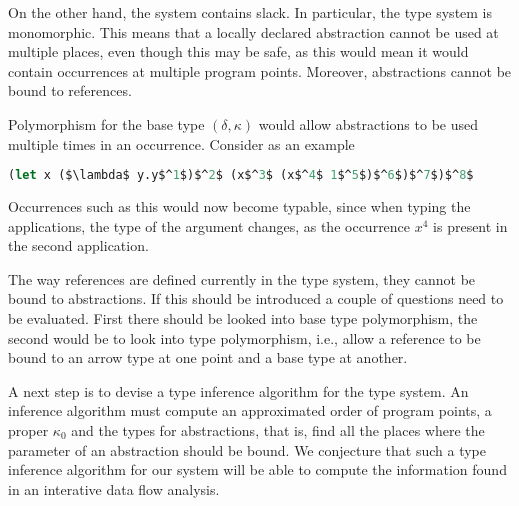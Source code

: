 \documentclass{llncs}
\begin{document}
On the other hand, the system contains slack. In particular, the type
system is monomorphic. This means that a locally declared abstraction
cannot be used at multiple places, even though this may be safe, as
this would mean it would contain occurrences at multiple program
points. Moreover, abstractions cannot be bound to references.

Polymorphism for the base type $(\delta,\kappa)$ would allow 
abstractions to be used multiple times in an occurrence. Consider as
an example

\begin{lstlisting}[language=Caml, mathescape=true]
(let x ($\lambda$ y.y$^1$)$^2$ (x$^3$ (x$^4$ 1$^5$)$^6$)$^7$)$^8$
\end{lstlisting}

Occurrences such as this would now become typable,
since when typing the applications, the type of the argument changes,
as the occurrence $x^4$ is present in the second application. 

The way references are defined currently in the type system, they cannot be bound to abstractions.
If this should be introduced a couple of questions need to be evaluated.
First there should be looked into base type polymorphism, the second
would be to look into type polymorphism, i.e., allow a reference to be bound to
an arrow type at one point and a base type at another.




A next step is to devise a type inference algorithm for the type
system. An inference algorithm must compute an approximated order of
program points, a proper $\kappa_0$ and the types for abstractions,
that is, find all the places where the parameter of an abstraction
should be bound.  We conjecture that such a type inference algorithm
for our system will be able to compute the information found in an
interative data flow analysis.



\end{document}
